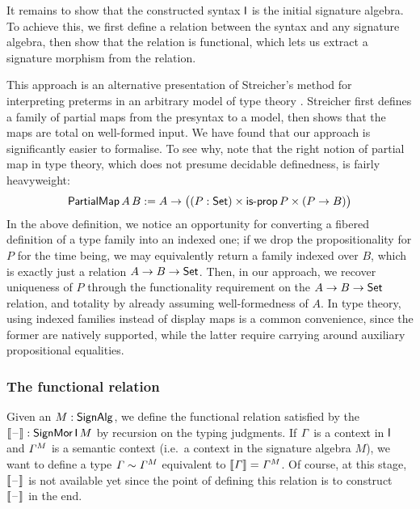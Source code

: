 It remains to show that the constructed syntax $\mathsf{I}$ is the initial
signature algebra. To achieve this, we first define a relation between
the syntax and any signature algebra, then show that the relation is
functional, which lets us extract a signature morphism from the relation.

This approach is an alternative presentation of Streicher's method for
interpreting preterms in an arbitrary model of type theory
\cite{streichersemantics}. Streicher first defines a family of partial
maps from the presyntax to a model, then shows that the maps are total
on well-formed input. We have found that our approach is significantly
easier to formalise. To see why, note that the right notion of partial
map in type theory, which does not presume decidable definedness, is
fairly heavyweight:
\[
  \mathsf{PartialMap}\,A\,B := A\rightarrow \big((P : \mathsf{Set})\times\mathsf{is\text{-}prop}\,P\times (P \rightarrow B)\big)
\]
In the above definition, we notice an opportunity for converting a fibered
definition of a type family into an indexed one; if we drop the propositionality
for $P$ for the time being, we may equivalently return a family indexed over
$B$, which is exactly just a relation $A\rightarrow B\rightarrow\mathsf{Set}$. Then, in our approach, we
recover uniqueness of $P$ through the functionality requirement on the $A\rightarrow
B\rightarrow\mathsf{Set}$ relation, and totality by already assuming well-formedness of $A$. In
type theory, using indexed families instead of display maps is a common
convenience, since the former are natively supported, while the
latter require carrying around auxiliary propositional equalities.

\subsubsection{The functional relation}

Given an $M : \mathsf{SignAlg}$, we define the functional relation satisfied by
the  $\llbracket\mathord{\hspace{1pt}\text{--}\hspace{1pt}}\rrbracket : \mathsf{SignMor}\,\mathsf{I}\, M$ by recursion on the typing judgments.
If $\mathit{\Gamma}$ is a context in $\mathsf{I}$ and ${\mathit{\Gamma}}^M$ is a semantic context
(i.e.\ a context in the signature algebra $M$), we want to define a type
$\mathit{\Gamma}\sim {\mathit{\Gamma}}^M$ equivalent to $\llbracket\mathit{\Gamma}\rrbracket ={\mathit{\Gamma}}^M$. Of
course, at this stage, $\llbracket\mathord{\hspace{1pt}\text{--}\hspace{1pt}}\rrbracket$ is not available yet since the point of
defining this relation is to construct $\llbracket\mathord{\hspace{1pt}\text{--}\hspace{1pt}}\rrbracket$ in the end.

